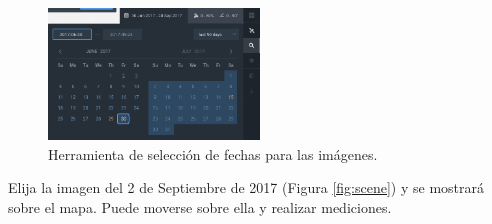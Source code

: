\documentclass[a4paper,12pt]{book}
\begin{document}
\begin{figure}[h!]
    \centering
    \includegraphics[width=0.5\textwidth]{fig:fecha.png}
    \caption{Herramienta de selección de fechas para las imágenes.}
    \label{fig:fecha}
\end{figure}


Elija la imagen del 2 de Septiembre de 2017 (Figura \ref{fig:scene}) y se mostrará sobre el mapa. Puede moverse sobre ella y realizar mediciones.
\end{document}
